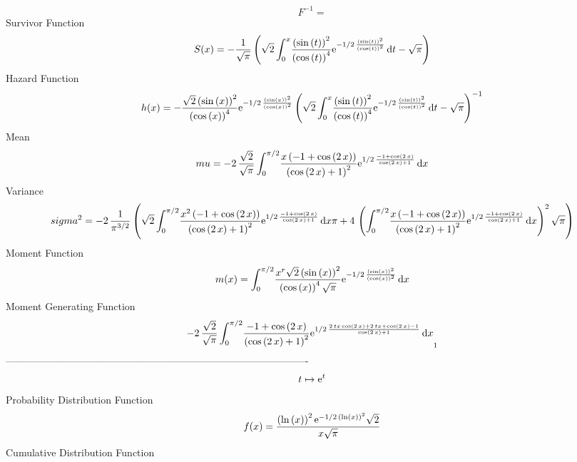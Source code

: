 \documentclass[12pt]{article}
\begin{document}
  $$F^{-1} = $$Survivor Function 
 $$ S(x)=-{\frac {1}{\sqrt {\pi}} \left( \sqrt {2}\int_{0}^{x}\!{\frac {
 \left( \sin \left( t \right)  \right) ^{2}}{ \left( \cos \left( t
 \right)  \right) ^{4}}{{\rm e}^{-1/2\,{\frac { \left( \sin \left( t
 \right)  \right) ^{2}}{ \left( \cos \left( t \right)  \right) ^{2}}}}
}}\,{\rm d}t-\sqrt {\pi} \right) }
$$ Hazard Function 
 $$ h(x)=-{\frac {\sqrt {2} \left( \sin \left( x \right)  \right) ^{2}}{
 \left( \cos \left( x \right)  \right) ^{4}}{{\rm e}^{-1/2\,{\frac {
 \left( \sin \left( x \right)  \right) ^{2}}{ \left( \cos \left( x
 \right)  \right) ^{2}}}}} \left( \sqrt {2}\int_{0}^{x}\!{\frac {
 \left( \sin \left( t \right)  \right) ^{2}}{ \left( \cos \left( t
 \right)  \right) ^{4}}{{\rm e}^{-1/2\,{\frac { \left( \sin \left( t
 \right)  \right) ^{2}}{ \left( \cos \left( t \right)  \right) ^{2}}}}
}}\,{\rm d}t-\sqrt {\pi} \right) ^{-1}}
$$Mean 
 $$ mu=-2\,{\frac {\sqrt {2}}{\sqrt {\pi}}\int_{0}^{\pi/2}\!{\frac {x \left( 
-1+\cos \left( 2\,x \right)  \right) }{ \left( \cos \left( 2\,x
 \right) +1 \right) ^{2}}{{\rm e}^{1/2\,{\frac {-1+\cos \left( 2\,x
 \right) }{\cos \left( 2\,x \right) +1}}}}}\,{\rm d}x}
$$ Variance 
 $$ sigma^2 = -2\,{\frac {1}{{\pi}^{3/2}} \left( \sqrt {2}\int_{0}^{\pi/2}\!{\frac {
{x}^{2} \left( -1+\cos \left( 2\,x \right)  \right) }{ \left( \cos
 \left( 2\,x \right) +1 \right) ^{2}}{{\rm e}^{1/2\,{\frac {-1+\cos
 \left( 2\,x \right) }{\cos \left( 2\,x \right) +1}}}}}\,{\rm d}x\pi+4
\, \left( \int_{0}^{\pi/2}\!{\frac {x \left( -1+\cos \left( 2\,x
 \right)  \right) }{ \left( \cos \left( 2\,x \right) +1 \right) ^{2}}{
{\rm e}^{1/2\,{\frac {-1+\cos \left( 2\,x \right) }{\cos \left( 2\,x
 \right) +1}}}}}\,{\rm d}x \right) ^{2}\sqrt {\pi} \right) }
$$Moment Function 
 $$ m(x) = \int_{0}^{\pi/2}\!{\frac {{x}^{r}\sqrt {2} \left( \sin \left( x
 \right)  \right) ^{2}}{ \left( \cos \left( x \right)  \right) ^{4}
\sqrt {\pi}}{{\rm e}^{-1/2\,{\frac { \left( \sin \left( x \right) 
 \right) ^{2}}{ \left( \cos \left( x \right)  \right) ^{2}}}}}}
\,{\rm d}x
$$ Moment Generating Function 
 $$-2\,{\frac {\sqrt {2}}{\sqrt {\pi}}\int_{0}^{\pi/2}\!{\frac {-1+\cos
 \left( 2\,x \right) }{ \left( \cos \left( 2\,x \right) +1 \right) ^{2
}}{{\rm e}^{1/2\,{\frac {2\,tx\cos \left( 2\,x \right) +2\,tx+\cos
 \left( 2\,x \right) -1}{\cos \left( 2\,x \right) +1}}}}}\,{\rm d}x}_{
{1}}
$$-------------------------------------------------------------------------------------------  \\$$t\mapsto {{\rm e}^{t}}
$$Probability Distribution Function 
$$  f(x)={\frac { \left( \ln  \left( x \right)  \right) ^{2}{{\rm e}^{-1/2\,
 \left( \ln  \left( x \right)  \right) ^{2}}}\sqrt {2}}{x\sqrt {\pi}}}
$$Cumulative Distribution Function  
\end{document}
